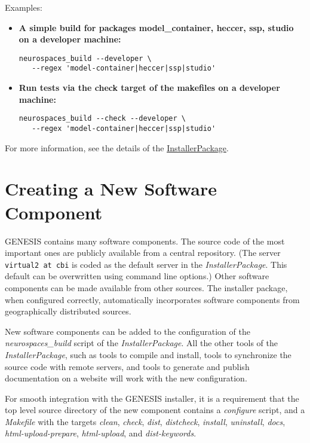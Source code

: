 \documentclass[12pt]{article}
\begin{document}
Examples:

\begin{itemize}

\item {\bf A simple build for packages model\_container, heccer, ssp, studio on a developer machine:}
\begin{verbatim}
neurospaces_build --developer \
   --regex 'model-container|heccer|ssp|studio'
\end{verbatim}

\item {\bf Run tests via the check target of the makefiles on a developer machine:}
\begin{verbatim}
neurospaces_build --check --developer \
   --regex 'model-container|heccer|ssp|studio'
\end{verbatim}
\end{itemize}

For more information, see the details of the \href{../installerpackage/installerpackage.tex}{InstallerPackage}. 

\section*{Creating a New Software Component}

GENESIS contains many software components. The source code of the most important ones are publicly available from a central repository. (The server {\tt virtual2 at cbi} is coded as the default server in the {\it InstallerPackage}. This default can be overwritten using command line options.) Other software components can be made available from other sources. The installer package, when configured correctly, automatically incorporates software components from geographically distributed sources.

New software components can be added to the configuration of the {\it neurospaces\_build} script of the {\it InstallerPackage}. All the other tools of the {\it InstallerPackage}, such as tools to compile and install, tools to synchronize the source code with remote servers, and tools to generate and publish documentation on a website will work with the new configuration.

For smooth integration with the GENESIS installer, it is a requirement that the top level source directory of the new component contains a {\it configure} script, and a {\it Makefile} with the targets {\it clean}, {\it check}, {\it dist}, {\it distcheck}, {\it install}, {\it uninstall}, {\it docs}, {\it html-upload-prepare}, {\it html-upload}, and {\it dist-keywords}.
\end{document}
